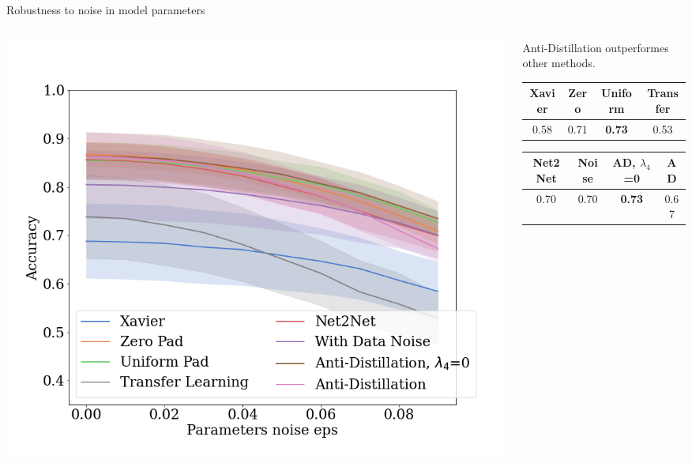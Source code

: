 \documentclass[dvipsnames,aspectratio=169]{beamer}
\begin{document}

\begin{frame}{Robustness to noise in model parameters}

    \begin{columns}
        \begin{column}{0.5\textwidth}
            \includegraphics[width=1.2\textwidth]{figures/noise.png}    
        \end{column}

        \begin{column}{0.5\textwidth}
            \begin{center}
            Anti-Distillation outperformes other methods.
            \bigskip

            \begin{tabular}{|c|c|c|c|}
                \hline Xavier & Zero & Uniform & Transfer\\
                \hline 0.58 & 0.71 & \textbf{0.73} & 0.53 \\
                \hline
            \end{tabular}
    
            \bigskip 
    
            \begin{tabular}{|c|c|c|c|}
            \hline Net2Net &  Noise & AD, $\lambda_4$=0 & AD\\
             \hline 0.70 & 0.70 & \textbf{0.73} & 0.67 \\
            \hline
            \end{tabular}
        \end{center}
        
        \end{column}
    \end{columns}

\end{frame}
\end{document}
